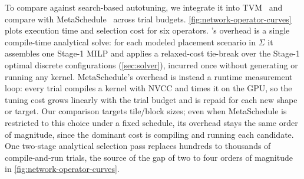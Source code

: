To compare \name against search-based autotuning, we integrate it into TVM~\cite{tvm} and compare with MetaSchedule~\cite{metaschedule} across trial budgets. \autoref{fig:network-operator-curves} plots execution time and selection cost for six operators. \name's overhead is a single compile-time analytical solve: for each modeled placement scenario in \(\Sigma\) it assembles one Stage-1 MILP and applies a relaxed-cost tie-break over the Stage-1 optimal discrete configurations (\autoref{sec:solver}), incurred once without generating or running any kernel. MetaSchedule's overhead is instead a runtime measurement loop: every trial compiles a kernel with NVCC and times it on the GPU, so the tuning cost grows linearly with the trial budget and is repaid for each new shape or target.  Our comparison targets tile/block sizes; even when MetaSchedule is restricted to this choice under a fixed schedule, its overhead stays the same order of magnitude, since the dominant cost is compiling and running each candidate. One two-stage analytical selection pass replaces hundreds to thousands of compile-and-run trials, the source of the gap of two to four orders of magnitude in \autoref{fig:network-operator-curves}.


